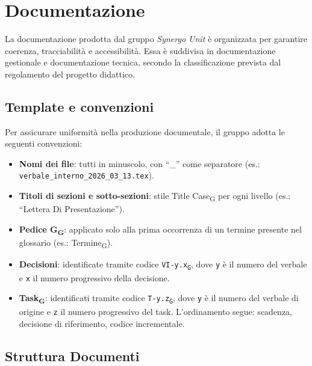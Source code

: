\section{Documentazione}

La documentazione prodotta dal gruppo \textit{Synergo Unit} è organizzata per garantire
coerenza, tracciabilità e accessibilità. Essa è suddivisa in documentazione gestionale e
documentazione tecnica, secondo la classificazione prevista dal regolamento del progetto
didattico.

\subsection{Template e convenzioni}

Per assicurare uniformità nella produzione documentale, il gruppo adotta le seguenti
convenzioni:

\begin{itemize}
    \item \textbf{Nomi dei file}: tutti in minuscolo, con ``\_'' come separatore
    (es.: \texttt{verbale\_interno\_2026\_03\_13.tex}).

    \item \textbf{Titoli di sezioni e sotto-sezioni}: stile Title Case\textsubscript{G} per ogni livello
    (es.: ``Lettera Di Presentazione'').

    \item \textbf{Pedice G\textsubscript{G}}: applicato solo alla prima occorrenza di un termine presente nel
    glossario (es.: Termine\textsubscript{G}).

    \item \textbf{Decisioni}: identificate tramite codice \texttt{VI-y.x\textsubscript{G}}, dove \texttt{y} è il numero del
    verbale e \texttt{x} il numero progressivo della decisione.

    \item \textbf{Task\textsubscript{G}}: identificati tramite codice \texttt{T-y.z\textsubscript{G}}, dove \texttt{y} è il numero del
    verbale di origine e \texttt{z} il numero progressivo del task. L’ordinamento segue:
    scadenza, decisione di riferimento, codice incrementale.
\end{itemize}

\subsection{Struttura Documenti}

